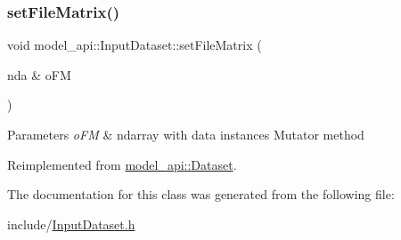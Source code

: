 \subsubsection{\texorpdfstring{set\+File\+Matrix()}{setFileMatrix()}}
{\footnotesize\ttfamily void model\+\_\+api\+::\+Input\+Dataset\+::set\+File\+Matrix (\begin{DoxyParamCaption}\item[{nda \&}]{o\+FM }\end{DoxyParamCaption})\hspace{0.3cm}{\ttfamily [virtual]}}


\begin{DoxyParams}{Parameters}
{\em o\+FM} & ndarray with data instances Mutator method \\
\hline
\end{DoxyParams}


Reimplemented from \hyperlink{classmodel__api_1_1Dataset_a50e8c50a3b45cb39cf4403ebfdc1c2dc}{model\+\_\+api\+::\+Dataset}.



The documentation for this class was generated from the following file\+:\begin{DoxyCompactItemize}
\item 
include/\hyperlink{InputDataset_8h}{Input\+Dataset.\+h}\end{DoxyCompactItemize}
